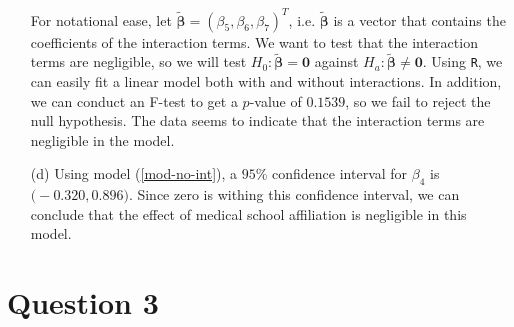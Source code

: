 \documentclass[10pt]{article}
\begin{document}
\begin{itemize}
    For notational ease, let \(\tilde{\bm{\beta}} = (\beta_5, \beta_6, \beta_7)^T\), i.e. \(\tilde{\bm{\beta}}\) is a vector that contains the coefficients of 
    the interaction terms. 
    We want to test that the interaction terms are negligible, so we will test \(H_0: \tilde{\bm{\beta}} = \mathbf{0}\) against 
    \(H_a : \tilde{\bm{\beta}} \neq \mathbf{0}\).
    Using \texttt{R}, we can easily fit a linear model both with and without interactions. In addition, we can conduct an F-test to get a 
    \(p\)-value of \(0.1539\), so we fail to reject the null hypothesis. The data seems to indicate that the interaction terms are 
    negligible in the model. 
    \item[(d)] Using model (\ref{mod-no-int}), a \(95\%{}\) confidence interval for \(\beta_4\) is \(\big( -0.320, 0.896 \big)\). Since zero is withing this 
    confidence interval, we can conclude that the effect of medical school affiliation is negligible in this model. 
\end{itemize}


\section{Question 3} \noindent



\end{document}
